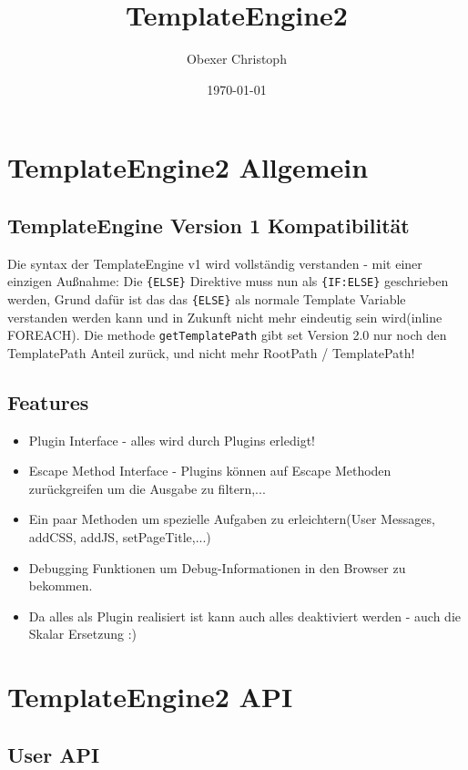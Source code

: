 \documentclass[a4paper,10pt]{article}
\title{TemplateEngine2}
\author{Obexer Christoph}
\date{\today}
\begin{document}
\maketitle
\pagebreak

\tableofcontents
\pagebreak

\section{TemplateEngine2 Allgemein}

\subsection{TemplateEngine Version 1 Kompatibilit\"at}
Die syntax der TemplateEngine v1 wird vollst\"andig verstanden - mit einer einzigen Au\ss{}nahme:\newline
Die {\tt \{ELSE\}} Direktive muss nun als {\tt \{IF:ELSE\}} geschrieben werden, Grund daf\"ur ist
das das {\tt \{ELSE\}} als normale Template Variable verstanden werden kann und in Zukunft nicht mehr
eindeutig sein wird(inline FOREACH).\newline
Die methode {\tt getTemplatePath} gibt set Version 2.0 nur noch den TemplatePath Anteil zur\"uck, und nicht mehr
RootPath / TemplatePath!

\subsection{Features}
\begin{itemize}
	\item Plugin Interface - alles wird durch Plugins erledigt!
	\item Escape Method Interface - Plugins k\"onnen auf Escape Methoden zur\"uckgreifen um die Ausgabe zu filtern,...
	\item Ein paar Methoden um spezielle Aufgaben zu erleichtern(User Messages, addCSS, addJS, setPageTitle,...)
	\item Debugging Funktionen um Debug-Informationen in den Browser zu bekommen.
	\item Da alles als Plugin realisiert ist kann auch alles deaktiviert werden - auch die Skalar Ersetzung :)
\end{itemize}


\section{TemplateEngine2 API}

\subsection{User API}
\end{document}

